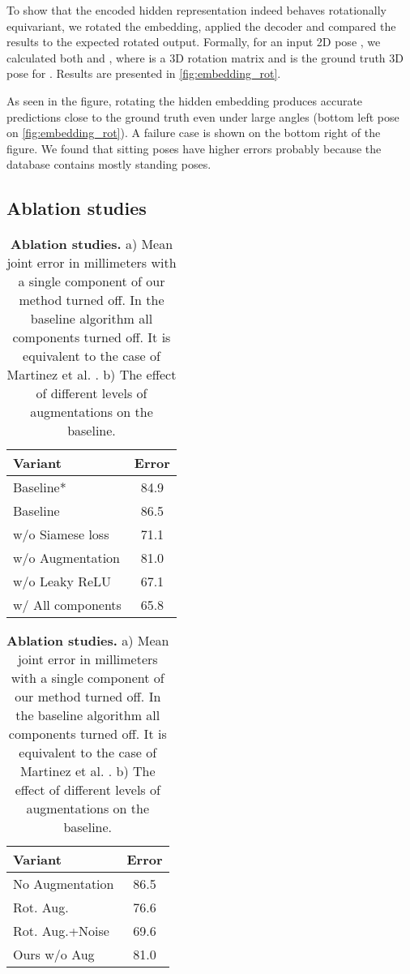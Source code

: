 \documentclass[preprint]{elsarticle}
\begin{document}
To show that the encoded hidden representation indeed behaves rotationally equivariant, we rotated the embedding, applied the decoder and compared the results to the expected rotated output. Formally, for an input 2D pose , we calculated both  and , where  is a 3D rotation matrix and  is the ground truth 3D pose for . Results are presented in \autoref{fig:embedding_rot}. 

As seen in the figure, rotating the hidden embedding produces accurate predictions close to the ground truth even under large angles (bottom left pose on \autoref{fig:embedding_rot}). A failure case is shown on the bottom right of the figure. We found that sitting poses have higher errors probably because the database contains mostly standing poses.

\subsection{Ablation studies}

\begin{table}[ht]
\centering
\begin{subtable}[t]{.45\columnwidth}
\centering
    \begin{tabular}[t]{lc}
    \hline
    Variant & Error \\
    \hline
    Baseline* & 84.9 \\
    Baseline & 86.5 \\
    \hline
    w/o Siamese loss & 71.1  \\
    w/o Augmentation & 81.0 \\
    w/o Leaky ReLU & 67.1 \\
    \hline
    w/ All components & 65.8 \\
    \hline
    \end{tabular}
    \caption{Error of our method with components turned off. *Results from \cite{fang2018posegrammar}. ~Results of our implementation.}
\end{subtable}
\hspace{0.5cm}
\begin{subtable}[t]{.45\columnwidth}
\centering
    \begin{tabular}[t]{lc}
    \hline
    Variant & Error \\
    \hline
    No Augmentation & 86.5 \\
    Rot. Aug. & 76.6 \\
    Rot. Aug.+Noise & 69.6 \\
    \hline
    Ours w/o Aug & 81.0 \\
    \hline
    \end{tabular}
    \vspace{0.6cm}
    \caption{Error of the Baseline method with different augmentations}
\end{subtable}
\caption{\textbf{Ablation studies.} a) Mean joint error in millimeters with a single component of our method turned off. In the baseline algorithm  all components turned off. It is equivalent to the case of Martinez et al. \cite{3dbaseline}. b) The effect of different levels of augmentations on the baseline.} \label{tbl:ablation} 
\end{table}
\end{document}
